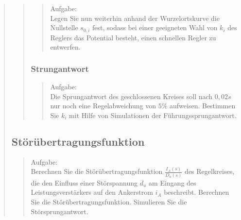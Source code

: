 \begin{quote}
\begin{quote}
        \begin{quote}
            Aufgabe:\\
            Legen Sie nun weiterhin anhand der Wurzelortskurve die Nullstelle $s_{0,i}$
            fest, sodass bei einer geeigneten Wahl von $k_i$ des Reglers
            das Potential besteht, einen schnellen Regler zu entwerfen.\\
        
        \end{quote}
            
        
        \subsubsection{Strungantwort}

        \begin{quote}
            Aufgabe:\\
            Die Sprungantwort des geschlossenen Kreises soll nach $0,02s$ nur noch eine Regelabweichung von $5\%$
            aufweisen. Bestimmen Sie $k_i$ mit Hilfe von Simulationen der Führungssprungantwort.\\
        
	 	
        \end{quote}

    \end{quote}
    
    
    \subsection{Störübertragungsfunktion}
    \begin{quote}
        Aufgabe:\\
        Berechnen Sie die Störübertragungsfunktion $\frac{I_A(s)}{D_u(s)}$ des Regelkreises, die den Einfluss
        einer Störspannung $d_u$ am Eingang des Leistungsverstärkers auf den Ankerstrom $i_A$ beschreibt.
        Berechnen Sie die Störübertragungsfunktion. Simulieren Sie die Störsprungantwort.\\
        
	 	
    \end{quote}    
    
    
    

\end{quote}

